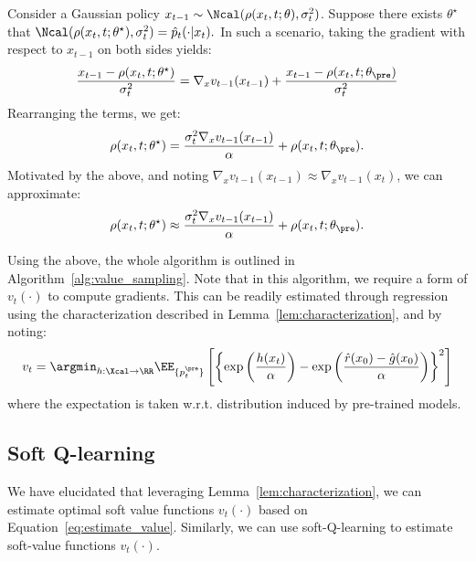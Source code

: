Consider a Gaussian policy $x_{t-1}\sim \Ncal(\rho(x_t,t;\theta),\sigma^2_t)$. Suppose there exists $\theta^{\star}$ that $\Ncal(\rho(x_t,t;\theta^{\star}),\sigma^2_t) = \hat p_t(\cdot|x_t).$ In such a scenario, taking the gradient with respect to $x_{t-1}$ on both sides yields:
\begin{align*}
    \frac{x_{t-1}- \rho(x_t, t; \theta^{\star})}{\sigma^2_t} = \nabla_x v_{t-1}(x_{t-1} ) +  \frac{x_{t-1}- \rho(x_t, t; \theta_{\pre})}{\sigma^2_t} 
\end{align*}
Rearranging the terms, we get:
\begin{align*}
    \rho(x_t, t; \theta^{\star}) = \frac{\sigma^2_t \nabla_x v_{t-1}(x_{t-1})}{\alpha} + \rho(x_t, t; \theta_{\pre}). 
\end{align*}
Motivated by the above, and noting $\nabla_x v_{t-1}(x_{t-1}) \approx \nabla_x v_{t-1}(x_{t})$, we can approximate:
\begin{align*}
    \rho(x_t, t; \theta^{\star}) \approx \frac{\sigma^2_t \nabla_x v_{t-1}(x_{t-1})}{\alpha} + \rho(x_t, t; \theta_{\pre}). 
\end{align*}

Using the above, the whole algorithm is outlined in Algorithm~\ref{alg:value_sampling}. Note that in this algorithm, we require a form of $v_t(\cdot)$ to compute gradients. This can be readily estimated through regression using the characterization described in Lemma~\ref{lem:characterization}, and by noting:
\begin{align}\label{eq:estimate_value}
     v_t = \argmin_{h:\Xcal \to \RR } \EE_{\{p^{\pre}_t\}} \left[\left \{ \exp\left(\frac{h(x_t)}{\alpha} \right) - \exp\left(\frac{\hat r(x_0)-\hat g(x_0)}{\alpha} \right ) \right \}^2  \right ] 
\end{align}
where the expectation is taken w.r.t. distribution induced by pre-trained models. 


 









\subsection{Soft Q-learning}

We have elucidated that leveraging Lemma~\ref{lem:characterization}, we can estimate optimal soft value functions $v_t(\cdot)$ based on Equation~\eqref{eq:estimate_value}. Similarly, we can use soft-Q-learning to estimate soft-value functions $v_t(\cdot)$.

